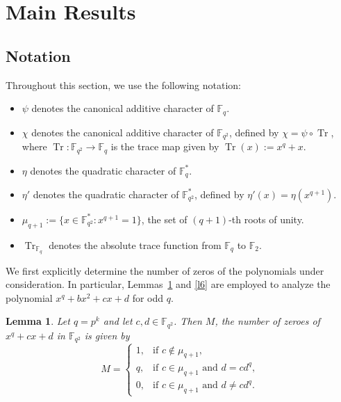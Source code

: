 \documentclass[12pt]{amsart}
\newtheorem{lemma}[theorem]{Lemma}
\theoremstyle{definition}
\theoremstyle{remark}
\numberwithin{equation}{section}
\begin{document}
\section{Main Results}
\subsection*{Notation}

Throughout this section, we use the following notation:

\begin{itemize}
    \item $\psi$ denotes the canonical additive character of $\mathbb{F}_q$.
    
    \item $\chi$ denotes the canonical additive character of $\mathbb{F}_{q^2}$, defined by $\chi = \psi \circ \operatorname{Tr}$, where $\operatorname{Tr} : \mathbb{F}_{q^2} \to \mathbb{F}_q$ is the trace map given by $
    \operatorname{Tr}(x):=x^q+x.$
    
    \item $\eta$ denotes the quadratic character of $\mathbb{F}_q^{*}$.
    
    \item $\eta'$ denotes the quadratic character of $\mathbb{F}_{q^2}^{*}$, defined by $
    \eta'(x)=\eta(x^{q+1}).$
    \item $\mu_{q+1}:=\{x\in \mathbb{F}_{q^2}^*: x^{q+1}=1\}$, the set of $(q+1)$-th roots of unity.
    \item $\operatorname{Tr}_{\mathbb{F}_q}$
denotes the absolute trace function from $\mathbb{F}_{q}$ to $\mathbb{F}_{2}$.
\end{itemize}
We first explicitly determine the number of zeros of the polynomials under consideration. In particular, Lemmas~\ref{l5} and \ref{l6} are employed to analyze the polynomial $x^q + b x^2 + c x + d$ for odd $q$.
\begin{lemma}\label{l5}
Let $q=p^k$ and let $c,d \in \mathbb{F}_{q^2}$. Then $M$, the number of zeroes of $
x^q+cx+d$
in $\mathbb{F}_{q^2}$ is given by
$$
M=\begin{cases}
1, & \text{if } c \notin \mu_{q+1},\\[1mm]
q, & \text{if } c \in \mu_{q+1} \text{ and } d=cd^q,\\[1mm]
0, & \text{if } c \in \mu_{q+1} \text{ and } d \neq cd^q.
\end{cases}
$$
\end{lemma}
\end{document}
